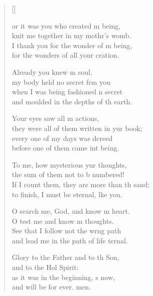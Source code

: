 \settowidth{\versewidth}{If I count them, they are more than the sand; *}
\begin{verse}[\versewidth]
  \begin{patverse}
or it was you who created m being,\Med\\
knit me together in my mothr’s womb.\\
I thank you for the wonder of m being,\Med\\
for the wonders of all your cration.

Already you knew m soul,\Med\\
my body held no secret frm you\\
when I was being fashioned \pointup{\i}n secret\Med\\
and moulded in the depths of th earth.

Your eyes saw all m actions,\Med\\
they were all of them written in yur book;\\
every one of my days was dcreed\Med\\
before one of them came int being.

To me, how mysterious yur thoughts,\Med\\
the sum of them not to b numbered!\\
If I count them, they are more than th sand;\Med\\
to finish, I must be eternal, l\pointup{\i}ke you.

O search me, God, and know m heart.\Med\\
O test me and know m thoughts.\\
See that I follow not the wrng path\Med\\
and lead me in the path of life ternal.

Glory to the Father and to th Son,\Med\\
and to the Hol Spirit:\\
as it was in the beginning, \pointup{\i}s now,\Med\\
and will be for ever. men.
  \end{patverse}
\end{verse}
